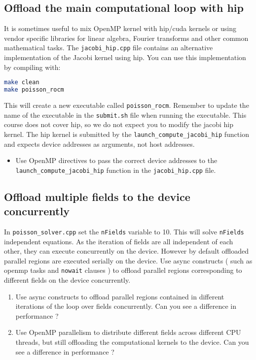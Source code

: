 \documentclass{article}
\begin{document}
\subsection{Offload the main computational loop with hip}
It is sometimes useful to mix OpenMP kernel with hip/cuda kernels or using vendor specific libraries for linear algebra, Fourier transforms and other common mathematical tasks. 
The \texttt{jacobi\_hip.cpp} file contains an alternative implementation of the Jacobi kernel using hip. You can use this implementation by compiling with: 

\begin{lstlisting}[language=Bash]
make clean
make poisson_rocm
\end{lstlisting}

This will create a new executable called \texttt{poisson\_rocm}. Remember to update the name of the executable in the \texttt{submit.sh} file when running the executable.
This course does not cover hip, so we do not expect you to modify the jacobi hip kernel. The hip kernel is submitted by the \texttt{launch\_compute\_jacobi\_hip} function and expects device addresses as arguments, not host addresses. 

\begin{itemize}
    \item Use OpenMP directives to pass the correct device addresses to the \texttt{launch\_compute\_jacobi\_hip} function in the \texttt{jacobi\_hip.cpp} file.
\end{itemize}

\subsection{Offload multiple fields to the device concurrently}
In \texttt{poisson\_solver.cpp} set the \texttt{nFields} variable to 10. This will solve \texttt{nFields} independent equations. As the iteration of fields are all independent of each other, they can execute concurrently on the device. However by default offloaded parallel regions are executed serially on the device. Use async constructs ( such as openmp tasks and \texttt{nowait} clauses ) to offload parallel regions corresponding to different fields on the device concurrently.
\begin{enumerate}
    \item Use async constructs to offload parallel regions contained in different iterations of the loop over fields concurrently. Can you see a difference in performance ?
    \item Use OpenMP parallelism to distribute different fields across different CPU threads, but still offloading the computational kernels to the device.  Can you see a difference in performance ?
\end{enumerate}
\end{document}
